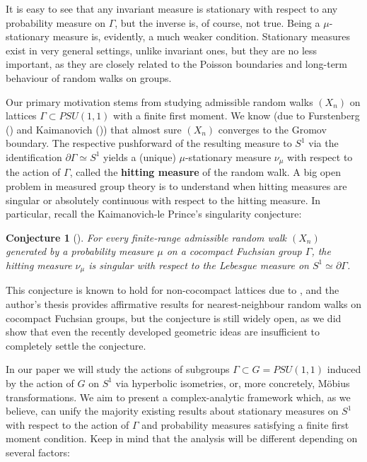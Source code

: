 \documentclass[11pt]{article}
\newtheorem{conjecture}{Conjecture}[section]
\begin{document}
It is easy to see that any invariant measure is stationary with respect to any probability measure on $\Gamma$, but the inverse is, of course, not true. Being a $\mu$-stationary measure is, evidently, a much weaker condition. Stationary measures exist in very general settings, unlike invariant ones, but they are no less important, as they are closely related to the Poisson boundaries and long-term behaviour of random walks on groups. 

Our primary motivation stems from studying admissible random walks $(X_n)$ on lattices $\Gamma \subset PSU(1,1)$ with a finite first moment. We know (due to Furstenberg (\cite{furstenberg71}) and Kaimanovich (\cite{kaimanovich2000poisson})) that almost sure $(X_n)$ converges to the Gromov boundary. The respective pushforward of the resulting measure to $S^1$ via the identification $\partial \Gamma \simeq S^1$ yields a (unique) $\mu$-stationary measure $\nu_\mu$ with respect to the action of $\Gamma$, called the \textbf{hitting measure} of the random walk. A big open problem in measured group theory is to understand when hitting measures are singular or absolutely continuous with respect to the hitting measure. In particular, recall the Kaimanovich-le Prince's singularity conjecture:

\begin{conjecture}[\cite{kaimanovich2011matrix}]
	\label{Fuchsian singularity conjecture}
	For every finite-range admissible random walk $(X_n)$ generated by a probability measure $\mu$ on a cocompact Fuchsian group $\Gamma$, the hitting measure $\nu_\mu$ is singular with respect to the Lebesgue measure on $S^1 \simeq \partial \Gamma$.
\end{conjecture}

This conjecture is known to hold for non-cocompact lattices due to \cite{guivarch1990}, and the author's thesis \cite{mythesis} provides affirmative results for nearest-neighbour random walks on cocompact Fuchsian groups, but the conjecture is still widely open, as we did show that even the recently developed geometric ideas are insufficient to completely settle the conjecture.

In our paper we will study the actions of subgroups $\Gamma \subset G = PSU(1,1)$ induced by the action of $G$ on $S^1$ via hyperbolic isometries, or, more concretely, M\"{o}bius transformations. We aim to present a complex-analytic framework which, as we believe, can unify the majority existing results about stationary measures on $S^1$ with respect to the action of $\Gamma$ and probability measures satisfying a finite first moment condition. Keep in mind that the analysis will be different depending on several factors:
\end{document}

